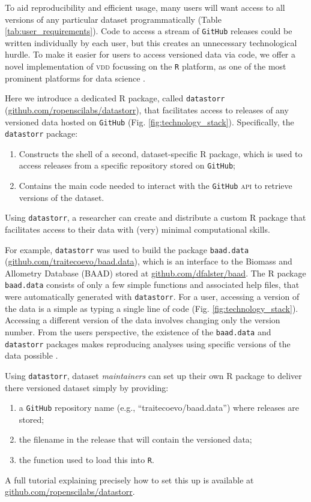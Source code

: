 \documentclass[a4paper,11pt]{article}
\newcommand{\smurl}[1]{{\footnotesize\href{https://#1}{#1}}}
\begin{document}
To aid reproducibility and efficient usage, many users will want access to all versions of any particular dataset programmatically (Table \ref{tab:user_requirements}). Code to access a stream of \texttt{GitHub} releases could be written individually by each user, but this creates an unnecessary technological hurdle. To make it easier for users to access versioned data via code, we offer a novel implementation of \textsc{vdd} focussing on the \texttt{R} platform, as one of the most prominent platforms for data science \citep{R-2017}.

Here we introduce a dedicated \textsc{R} package, called \texttt{datastorr} (\smurl{github.com/ropenscilabs/datastorr}), that facilitates access to releases of any versioned data hosted on \texttt{GitHub} (Fig. \ref{fig:technology_stack}). Specifically, the \texttt{datastorr} package:
\begin{enumerate}
  \item Constructs the shell of a second, dataset-specific \textsc{R} package, which is used to access releases from a specific repository stored on \texttt{GitHub};
  \item Contains the main code needed to interact with the \texttt{GitHub} \textsc{api} to retrieve versions of the dataset.
\end{enumerate}
Using \texttt{datastorr}, a researcher can create and distribute a custom \textsc{R} package that facilitates access to their data with (very) minimal computational skills.

For example, \texttt{datastorr} was used to build the package \texttt{baad.data} (\smurl{github.com/traitecoevo/baad.data}), which is an interface to the Biomass and Allometry Database (\textsc{BAAD}) \citep{Falster-2015} stored at \smurl{github.com/dfalster/baad}. The R package \texttt{baad.data} consists of only a few simple functions and associated help files, that were automatically generated with \texttt{datastorr}. For a user, accessing a version of the data is a simple as typing a single line of code (Fig. \ref{fig:technology_stack}). Accessing a different version of the data involves changing only the version number. From the users perspective, the existence of the \texttt{baad.data} and \texttt{datastorr} packages makes reproducing analyses using specific versions of the data possible \citep[e.g.][]{Duursma-2016,Falster-2016}.

Using \texttt{datastorr}, dataset \emph{maintainers} can set up their own R package to deliver there versioned dataset simply by providing:
\begin{enumerate}
  \item a \texttt{GitHub} repository name (e.g., ``traitecoevo/baad.data'') where releases are stored;
  \item the filename in the release that will contain the versioned data;
  \item the function used to load this into \texttt{R}.
\end{enumerate}
A full tutorial explaining precisely how to set this up is available at \smurl{github.com/ropenscilabs/datastorr}.
\end{document}
